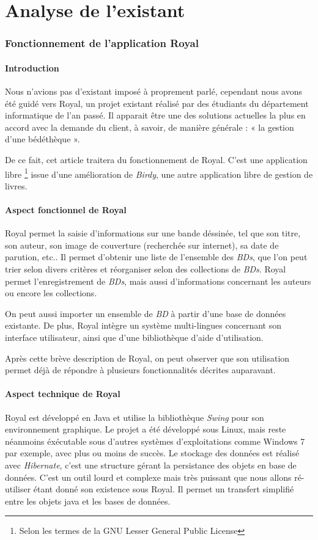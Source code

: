 \part{Analyse de l'existant}


\section{Fonctionnement de l'application Royal}

\subsection{Introduction}
Nous n'avions pas d'existant imposé à proprement parlé, cependant nous avons été guidé vers Royal, un projet existant réalisé par des étudiants du département informatique de l'an passé.
Il apparait être une des solutions actuelles la plus en accord avec la demande du client, à savoir, de manière générale : « la gestion d'une bédéthèque ».

De ce fait, cet article traitera du fonctionnement de Royal.
C'est une application 
libre \footnote{Selon les termes de la GNU Lesser General Public License}
issue d'une amélioration de \emph{Birdy}, une autre application libre de gestion de livres.

\subsection{Aspect fonctionnel de Royal}
Royal permet la saisie d'informations sur une bande déssinée, tel que son titre, son auteur, son image de couverture (recherchée sur internet), sa date de parution, etc..
Il permet d'obtenir une liste de l'ensemble des \emph{BDs}, que l'on peut trier selon divers critères et réorganiser selon des collections de \emph{BDs}.
Royal permet l'enregistrement de \emph{BDs}, mais aussi d'informations concernant les auteurs ou encore les collections.

On peut aussi importer un ensemble de \emph{BD} à partir d'une base de données existante.
De plus, Royal intègre un système multi-lingues concernant son interface utilisateur, ainsi que d'une bibliothèque d'aide d'utilisation.

Après cette brève description de Royal, on peut observer que son utilisation permet déjà de répondre à plusieurs fonctionnalités décrites auparavant. 

\subsection{Aspect technique de Royal}
Royal est développé en Java et utilise la bibliothèque \emph{Swing} pour son environnement graphique. 
Le projet a été développé sous Linux, mais reste néanmoins éxécutable sous d'autres systèmes d'exploitations comme Windows 7 par exemple, avec plus ou moins de succès. 
Le stockage des données est réalisé avec \emph{Hibernate}, c'est une structure gérant la persistance des objets en base de données. 
C'est un outil lourd et complexe mais très puissant que nous allons ré-utiliser étant donné son existence sous Royal. 
Il permet un transfert simplifié entre les objets java et les bases de données.

